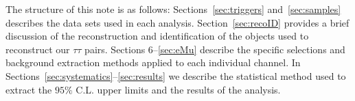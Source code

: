 The structure of this note is as follows: Sections~\ref{sec:triggers} and~\ref{sec:samples} describes the data sets used in each analysis. 
Section~\ref{sec:recoID} provides a brief discussion of the reconstruction and identification of the objects used to reconstruct our  $\tau\tau$ 
pairs.
Sections 6--\ref{sec:eMu} describe the specific selections and background extraction methods applied  to each
individual channel. In Sections~\ref{sec:systematics}--\ref{sec:results} we describe the statistical method used to extract 
the $95\%$ C.L. upper limits and the results of the analysis. 


